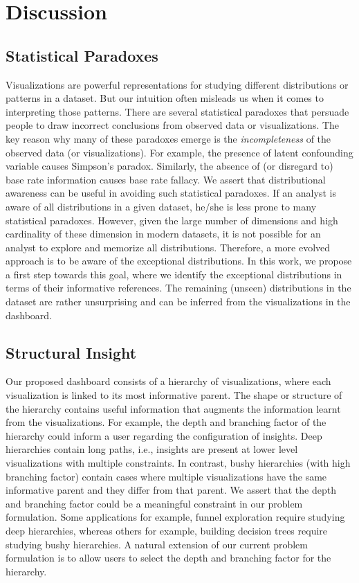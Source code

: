 \section{Discussion}
\subsection{Statistical Paradoxes}
Visualizations are powerful representations for studying different distributions or patterns in a dataset. But our intuition often misleads us when it comes to interpreting those patterns. There are several statistical paradoxes that persuade people to draw incorrect conclusions from observed data or visualizations. The key reason why many of these paradoxes emerge is the \emph{incompleteness} of the observed data (or visualizations). For example, the presence of latent confounding variable causes Simpson's paradox. Similarly, the absence of (or disregard to) base rate information causes base rate fallacy. We assert that distributional awareness can be useful in avoiding such statistical paradoxes. If an analyst is aware of all distributions in a given dataset, he/she is less prone to many statistical paradoxes. However, given the large number of dimensions and high cardinality of these dimension in modern datasets, it is not possible for an analyst to explore and memorize all distributions. Therefore, a more evolved approach is to be aware of the exceptional distributions. In this work, we propose a first step towards this goal, where we identify the exceptional distributions in terms of their informative references. The remaining (unseen) distributions in the dataset are rather unsurprising and can be inferred from the visualizations in the dashboard.

\subsection{Structural Insight}
Our proposed dashboard consists of a hierarchy of visualizations, where each visualization is linked to its most informative parent. The shape or structure of the hierarchy contains useful information that augments the information learnt from the visualizations. For example, the depth and branching factor of the hierarchy could inform a user regarding the configuration of insights. Deep hierarchies contain long paths, i.e., insights are present at lower level visualizations with multiple constraints. In contrast, bushy hierarchies (with high branching factor) contain cases where multiple visualizations have the same informative parent and they differ from that parent. We assert that the depth and branching factor could be a meaningful constraint in our problem formulation. Some applications for example, funnel exploration require studying deep hierarchies, whereas others for example, building decision trees require studying bushy hierarchies. A natural extension of our current problem formulation is to allow users to select the depth and branching factor for the hierarchy.


